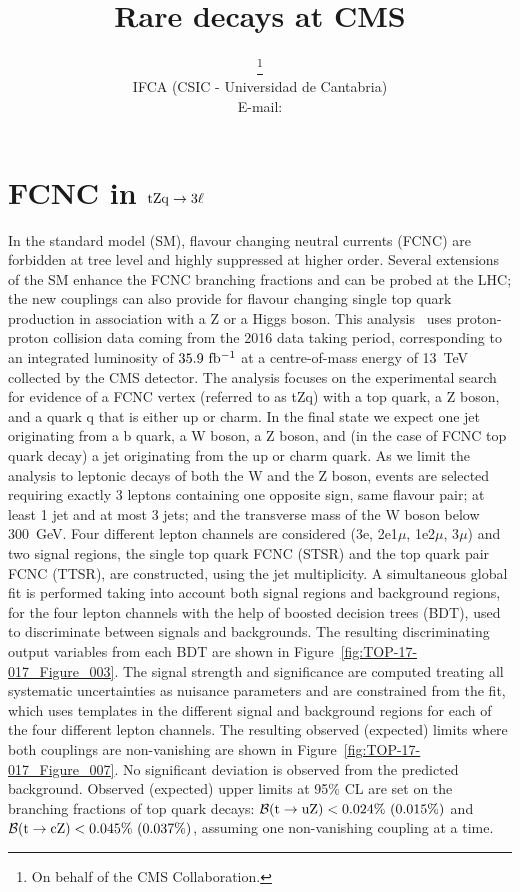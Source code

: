 \documentclass{PoS}
\title{Rare decays at CMS}
\author{\speaker{J\'onatan Piedra}\thanks{On behalf of the CMS Collaboration.}\\
        IFCA (CSIC - Universidad de Cantabria)\\
        E-mail: \email{piedra@cern.ch}}
\begin{document}


\section{FCNC in ${\rm tZq \to 3\ell}$}

In the standard model (SM), flavour changing neutral currents (FCNC) are
forbidden at tree level and highly suppressed at higher order. Several
extensions of the SM enhance the FCNC branching fractions and can be probed at
the LHC; the new couplings can also provide for flavour changing single top
quark production in association with a Z or a Higgs boson.
This analysis~\cite{top-17-017} uses proton-proton collision data coming from the
2016 data taking period, corresponding to an integrated luminosity of
${\rm 35.9~fb^{-1}}$ at a centre-of-mass energy of 13~TeV collected by the CMS
detector. The analysis focuses on the experimental search for evidence of a FCNC
vertex (referred to as tZq) with a top quark, a Z boson, and a quark q that is
either up or charm. In the final state we expect one jet originating from a b quark,
a W boson, a Z boson, and (in the case of FCNC top quark decay) a jet originating
from the up or charm quark. As we limit the analysis to leptonic decays of both the
W and the Z boson, events are selected requiring exactly 3 leptons containing one
opposite sign, same flavour pair; at least 1 jet and at most 3 jets; and the
transverse mass of the W boson below 300~GeV. Four different lepton channels are
considered (3e, 2e1$\mu$, 1e2$\mu$, 3$\mu$) and two signal regions, the single top
quark FCNC (STSR) and the top quark pair FCNC (TTSR), are constructed, using the
jet multiplicity. A simultaneous global fit is performed taking into account
both signal regions and background regions, for the four lepton channels with the
help of boosted decision trees (BDT), used to discriminate between signals and
backgrounds. The resulting discriminating output variables from each BDT are
shown in Figure~\ref{fig:TOP-17-017_Figure_003}. The signal strength and significance
are computed treating all systematic uncertainties as nuisance parameters and are
constrained from the fit, which uses templates in the different signal and
background regions for each of the four different lepton channels. The resulting
observed (expected) limits where both couplings are non-vanishing are shown in
Figure~\ref{fig:TOP-17-017_Figure_007}. No significant deviation is observed from
the predicted background. Observed (expected) upper limits at 95\% CL are set on
the branching fractions of top quark decays:
${\cal B}({\rm t \to uZ}) < 0.024\%~(0.015\%)$ and
${\cal B}({\rm t \to cZ}) < 0.045\%~(0.037\%)$, assuming one non-vanishing
coupling at a time.
\end{document}
